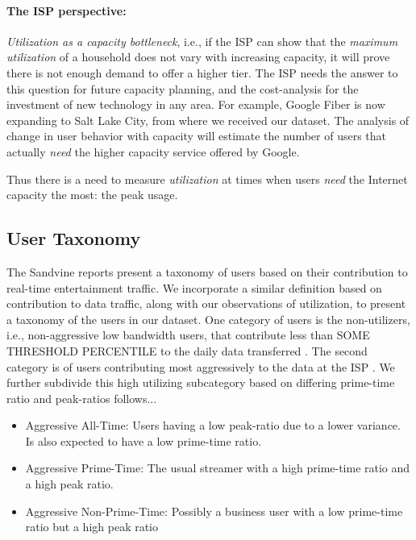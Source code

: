 \paragraph{The ISP perspective: }\emph{Utilization as a capacity bottleneck}, i.e., if
the ISP can show that the \emph{maximum utilization} of a household does not vary
with increasing capacity, it will prove there is not enough demand to offer a higher tier.  
The ISP needs the answer to this question for future capacity planning, and the cost-analysis
for the investment of new technology in any area.
For example, Google Fiber is now expanding to Salt Lake City, from where we received our dataset.
The analysis of change in user behavior with capacity will estimate the number of users that
actually \emph{need} the higher capacity service offered by Google.

Thus there is a need to measure \emph{utilization} at times when users \emph{need} the Internet
capacity the most: the peak usage.



\subsection{User Taxonomy}


The Sandvine reports present a taxonomy of users based on their contribution to real-time entertainment traffic. We incorporate a similar definition based on contribution to data traffic, along with our observations of utilization, to present a taxonomy of the users in our dataset. One category of users is the non-utilizers, i.e., non-aggressive low bandwidth users, that contribute less than SOME THRESHOLD PERCENTILE to the daily data transferred . The second category is of users contributing most aggressively to the data at the ISP . We further subdivide this high utilizing subcategory based on differing prime-time ratio and peak-ratios follows... 
\begin{itemize}
\item Aggressive All-Time: Users having a low peak-ratio due to a lower variance. Is also expected to have a low prime-time ratio.
\item Aggressive Prime-Time: The usual streamer with a high prime-time ratio and a high peak ratio.
\item Aggressive Non-Prime-Time: Possibly a business user with a low prime-time ratio  but a high peak ratio
\end{itemize}